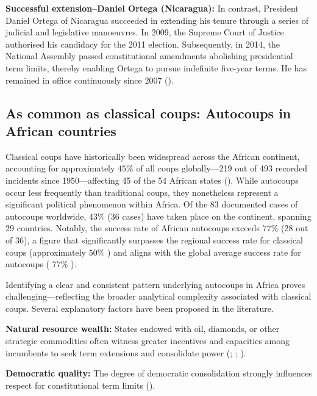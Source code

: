 \documentclass[
  12pt,
]{report}
\begin{document}
\textbf{Successful extension--Daniel Ortega (Nicaragua):} In contrast,
President Daniel Ortega of Nicaragua succeeded in extending his tenure
through a series of judicial and legislative manoeuvres. In 2009, the
Supreme Court of Justice authorised his candidacy for the 2011 election.
Subsequently, in 2014, the National Assembly passed constitutional
amendments abolishing presidential term limits, thereby enabling Ortega
to pursue indefinite five-year terms. He has remained in office
continuously since 2007 ().

\subsection{As common as classical coups: Autocoups in African
countries}\label{as-common-as-classical-coups-autocoups-in-african-countries}

Classical coups have historically been widespread across the African
continent, accounting for approximately \(45\%\) of all coups
globally---219 out of 493 recorded incidents since 1950---affecting 45
of the 54 African states (). While autocoups occur less frequently than traditional coups,
they nonetheless represent a significant political phenomenon within
Africa. Of the 83 documented cases of autocoups worldwide, \(43\%\) (36
cases) have taken place on the continent, spanning 29 countries.
Notably, the success rate of African autocoups exceeds \(77\%\) (28 out
of 36), a figure that significantly surpasses the regional success rate
for classical coups (approximately \(50\%\) ) and aligns with the global
average success rate for autocoups ( \(77\%\) ).

Identifying a clear and consistent pattern underlying autocoups in
Africa proves challenging---reflecting the broader analytical complexity
associated with classical coups. Several explanatory factors have been
proposed in the literature.

\textbf{Natural resource wealth:} States endowed with oil, diamonds, or
other strategic commodities often witness greater incentives and
capacities among incumbents to seek term extensions and consolidate
power (;
;
).

\textbf{Democratic quality:} The degree of democratic consolidation
strongly influences respect for constitutional term limits
().
\end{document}
